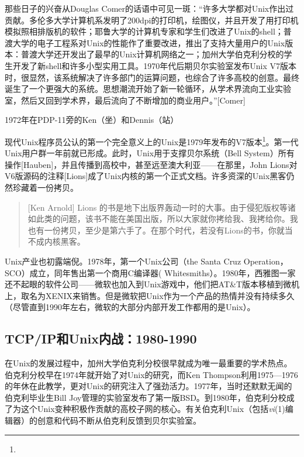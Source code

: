 \documentclass[11pt,oneside]{book}
\begin{document}
\begin{common-format}
那些日子的兴奋从Douglas Comer的话语中可见一斑：“许多大学都对Unix作出过贡献。多伦多大学计算机系发明了200dpi的打印机，绘图仪，并且开发了用打印机模拟照相排版机的软件；耶鲁大学的计算机专家和学生们改进了Unix的shell；普渡大学的电子工程系对Unix的性能作了重要改进，推出了支持大量用户的Unix版本：普渡大学还开发出了最早的Unix计算机网络之一；加州大学伯克利分校的学生开发了新shell和许多小型实用工具。1970年代后期贝尔实验室发布Unix V7版本时，很显然，该系统解决了许多部门的运算问题，也综合了许多高校的创意。最终诞生了一个更强大的系统。思想潮流开始了新一轮循环，从学术界流向工业实验室，然后又回到学术界，最后流向了不断增加的商业用户。”[Comer]
\begin{fig}[7]{1972年在PDP-11旁的Ken（坐）和Dennis（站）}
\label{fig:1972年在PDP-11旁的Ken（坐）和Dennis（站）}
\end{fig}

现代Unix程序员公认的第一个完全意义上的Unix是1979年发布的V7版本\footnote{}。第一代Unix用户群一年前就已形成。此时，Unix用于支撑贝尔系统（Bell System）所有操作[Hauben]，并且传播到高校中，甚至远至澳大利亚——在那里，John Lions对V6版源码的注释[Lions]成了Unix内核的第一个正式文档。许多资深的Unix黑客仍然珍藏着一份拷贝。

\begin{quote}[Ken Arnold]
Lions 的书是地下出版界轰动一时的大事。由于侵犯版权等诸如此类的问题，该书不能在美国出版，所以大家就你拷给我、我拷给你。我也有一份拷贝，至少是第六手了。在那个时代，若没有Lions的书，你就当不成内核黑客。
\end{quote}

Unix产业也初露端倪。1978年，第一个Unix公司（the Santa Cruz Operation，SCO）成立，同年售出第一个商用C编译器( Whitesmiths）。1980年，西雅图一家还不起眼的软件公司——微软也加入到Unix游戏中，他们把AT\&{}T版本移植到微机上，取名为XENIX来销售。但是微软把Unix作为一个产品的热情并没有持续多久（尽管直到1990年左右，微软的大部分内部开发工作都用的是Unix）。

\subsection{TCP/IP和Unix内战：1980-1990}
在Unix的发展过程中，加州大学伯克利分校很早就成为唯一最重要的学术热点。伯克利分校早在1974年就开始了对Unix的研究，而Ken Thompson利用1975—1976的年休在此教学，更对Unix的研究注入了强劲活力。1977年，当时还默默无闻的伯克利毕业生Bill Joy管理的实验室发布了第一版BSD。到1980年，伯克利分校成了为这个Unix变种积极作贡献的高校子网的核心。有关伯克利Unix（包括\textit{vi}(1)编辑器）的创意和代码不断从伯克利反馈到贝尔实验室。


\end{common-format}
\end{document}
